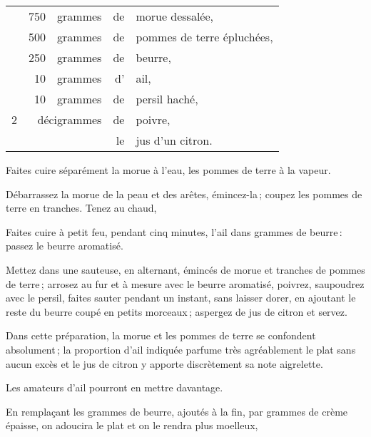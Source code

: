 \footnotesize
\begin{longtable}{rrrrp{16em}}
  & 750 & grammes     & de & morue dessalée,                                                              \\
  & 500 & grammes     & de & pommes de terre épluchées,                                                   \\
  & 250 & grammes     & de & beurre,                                                                      \\
  &  10 & grammes     & d’ & ail,                                                                         \\
  &  10 & grammes     & de & persil haché,                                                                \\
2 & \multicolumn{2}{r}{décigrammes} & de & poivre,                                                        \\
  &     &             & le & jus d'un citron.                                                             \\
\end{longtable}
\normalsize

Faites cuire séparément la morue à l’eau, les pommes de terre à la vapeur.

Débarrassez la morue de la peau et des arêtes, émincez-la ; coupez les pommes
de terre en tranches. Tenez au chaud,

Faites cuire à petit feu, pendant cinq minutes, l'ail dans {\mmm} grammes de
beurre : passez le beurre aromatisé.

Mettez dans une sauteuse, en alternant, émincés de morue et tranches de pommes
de terre ; arrosez au fur et à mesure avec le beurre aromatisé, poivrez,
saupoudrez avec le persil, faites sauter pendant un instant, sans laisser
dorer, en ajoutant le reste du beurre coupé en petits morceaux ; aspergez de
jus de citron et servez.

Dans cette préparation, la morue et les pommes de terre se confondent
absolument ; la proportion d'ail indiquée parfume très agréablement le plat
sans aucun excès et le jus de citron y apporte discrètement sa note aigrelette.

Les amateurs d'ail pourront en mettre davantage.

\sk

En remplaçant les {\mmm} grammes de beurre, ajoutés à la fin, par {\mmm} grammes
de crème épaisse, on adoucira le plat et on le rendra plus moelleux,

